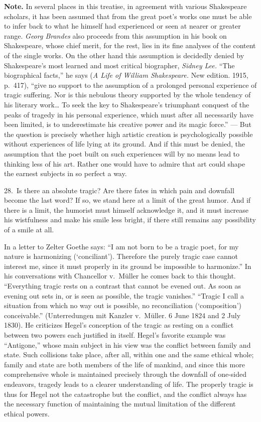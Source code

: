 \documentclass[12pt]{book}
\newcommand{\opage}[1]{\marginnote{\footnotesize\textit{[#1]}}}
\begin{document}
{\small\textbf{Note.} In several places in this treatise, in agreement with various
Shakespeare scholars, it has been assumed that from the great poet's works one must be
able to infer back to what he himself had \opage{100}experienced or seen at nearer or
greater range. \textit{Georg Brandes} also proceeds from this assumption in his book on
Shakespeare, whose chief merit, for the rest, lies in its fine analyses of the content of
the single works. On the other hand this assumption is decidedly denied by Shakespeare's
most learned and most critical biographer, \textit{Sidney Lee.} ``The biographical
facts,'' he says (\textit{A Life of William Shakespeare.} New edition. 1915, p.~417),
``give no support to the assumption of a prolonged personal experience of tragic
suffering. Nor is this nebulous theory supported by the whole tendency of his literary
work\dots{} To seek the key to Shakespeare's triumphant conquest of the peaks of tragedy
in his personal experience, which must after all necessarily have been limited, is to
underestimate his creative power and its magic force.'' --- But the question is precisely
whether high artistic creation is psychologically possible without experiences of life
lying at its ground. And if this must be denied, the assumption that the poet built on
such experiences will by no means lead to thinking less of his art. Rather one would have
to admire that art could shape the earnest subjects in so perfect a way.\par}

28.~Is there an absolute tragic? Are there fates in which pain and downfall become the
last word? If so, we stand here at a limit of the great humor. And if there is a limit,
the humorist must himself acknowledge it, and it must increase his wistfulness and make
his smile less bright, if there still remains any possibility of a smile at all.

In a letter to Zelter Goethe says: ``I am not born to be a tragic poet, for my nature is
harmonizing (`conciliant'). Therefore the purely tragic case cannot interest me, since it
must properly in its ground be impossible to harmonize.'' In his conversations with
Chancellor v.~Müller he comes back to this thought. ``Everything tragic rests on a
contrast that cannot be evened out. As soon as evening out sets in, or is seen as
possible, the tragic vanishes.'' ``Tragic I call a situation from which no way out is
possible, no reconciliation (`composition') conceivable.'' (Unterredungen mit Kanzler
v.~Müller. 6 June 1824 and 2 July 1830). He criticizes Hegel's conception of the tragic as
resting on a conflict between two powers each justified in itself. Hegel's favorite
example was ``Antigone,'' whose main subject in his view was the conflict between family
and state. Such collisions take place, after all, within one and the same ethical whole;
family and state are both members of the life of mankind, and since \opage{101}this more
comprehensive whole is maintained precisely through the downfall of one-sided endeavors,
tragedy leads to a clearer understanding of life. The properly tragic is thus for Hegel
not the catastrophe but the conflict, and the conflict always has the necessary function
of maintaining the mutual limitation of the different ethical powers.
\end{document}
